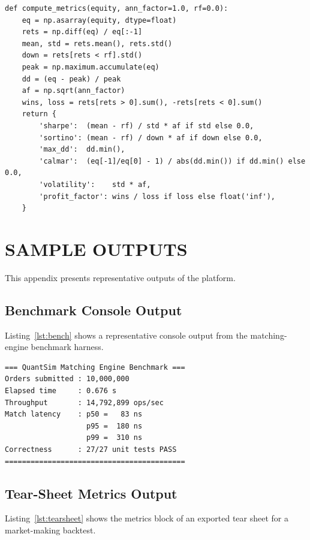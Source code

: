 \documentclass[12pt,oneside,a4paper]{report}
\begin{document}
\begin{lstlisting}[style=pystyle,caption={Risk-adjusted metric computation},label={lst:metrics}]
def compute_metrics(equity, ann_factor=1.0, rf=0.0):
    eq = np.asarray(equity, dtype=float)
    rets = np.diff(eq) / eq[:-1]
    mean, std = rets.mean(), rets.std()
    down = rets[rets < rf].std()
    peak = np.maximum.accumulate(eq)
    dd = (eq - peak) / peak
    af = np.sqrt(ann_factor)
    wins, loss = rets[rets > 0].sum(), -rets[rets < 0].sum()
    return {
        'sharpe':  (mean - rf) / std * af if std else 0.0,
        'sortino': (mean - rf) / down * af if down else 0.0,
        'max_dd':  dd.min(),
        'calmar':  (eq[-1]/eq[0] - 1) / abs(dd.min()) if dd.min() else 0.0,
        'volatility':    std * af,
        'profit_factor': wins / loss if loss else float('inf'),
    }
\end{lstlisting}

\chapter{SAMPLE OUTPUTS}
\label{app:outputs}

This appendix presents representative outputs of the platform.

\section{Benchmark Console Output}

Listing~\ref{lst:bench} shows a representative console output from the matching-engine benchmark harness.

\begin{lstlisting}[style=pystyle,caption={Matching engine benchmark output},label={lst:bench}]
=== QuantSim Matching Engine Benchmark ===
Orders submitted : 10,000,000
Elapsed time     : 0.676 s
Throughput       : 14,792,899 ops/sec
Match latency    : p50 =   83 ns
                   p95 =  180 ns
                   p99 =  310 ns
Correctness      : 27/27 unit tests PASS
==========================================
\end{lstlisting}

\section{Tear-Sheet Metrics Output}

Listing~\ref{lst:tearsheet} shows the metrics block of an exported tear sheet for a market-making backtest.
\end{document}
